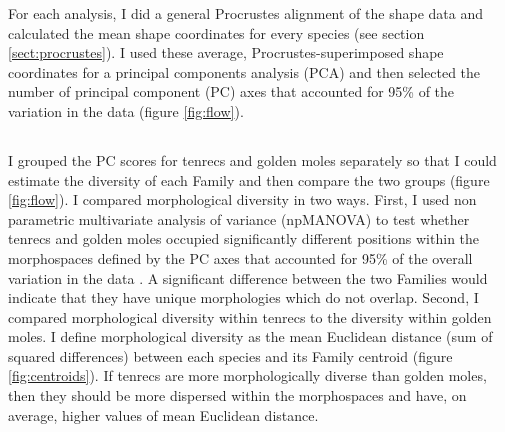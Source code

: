 	For each analysis, I did a general Procrustes alignment of the shape data and calculated the mean shape coordinates for every species (see section \ref{sect:procrustes}). I used these average, Procrustes-superimposed shape coordinates for a principal components analysis (PCA) and then selected the number of principal component (PC) axes that accounted for 95\% of the variation in the data (figure \ref{fig:flow}).
	
\subsection{}


	
	I grouped the PC scores for tenrecs and golden moles separately so that I could estimate the diversity of each Family and then compare the two groups (figure \ref{fig:flow}). I compared morphological diversity in two ways. First, I used non parametric multivariate analysis of variance (npMANOVA) \citep{Anderson2001} to test whether tenrecs and golden moles occupied significantly different positions within the morphospaces defined by the PC axes that accounted for 95\% of the overall variation in the data \citep[e.g][]{Serb2011, Ruta2013}. A significant difference between the two Families would indicate that they have unique morphologies which do not overlap. Second, I compared morphological diversity within tenrecs to the diversity within golden moles. I define morphological diversity as the mean Euclidean distance (sum of squared differences) %
	between each species and its Family centroid (figure \ref{fig:centroids}). If tenrecs are more morphologically diverse than golden moles, then they should be more dispersed within the morphospaces and have, on average, higher values of mean Euclidean distance. 

